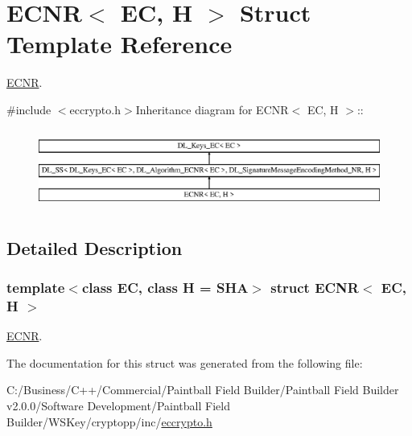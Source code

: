 \hypertarget{struct_e_c_n_r}{
\section{ECNR$<$ EC, H $>$ Struct Template Reference}
\label{struct_e_c_n_r}
}


\hyperlink{struct_e_c_n_r}{ECNR}.  


{\ttfamily \#include $<$eccrypto.h$>$}Inheritance diagram for ECNR$<$ EC, H $>$::\begin{figure}[H]
\begin{center}
\leavevmode
\includegraphics[height=2.625cm]{struct_e_c_n_r}
\end{center}
\end{figure}


\subsection{Detailed Description}
\subsubsection*{template$<$class EC, class H = SHA$>$ struct ECNR$<$ EC, H $>$}

\hyperlink{struct_e_c_n_r}{ECNR}. 

The documentation for this struct was generated from the following file:\begin{DoxyCompactItemize}
\item 
C:/Business/C++/Commercial/Paintball Field Builder/Paintball Field Builder v2.0.0/Software Development/Paintball Field Builder/WSKey/cryptopp/inc/\hyperlink{eccrypto_8h}{eccrypto.h}\end{DoxyCompactItemize}
